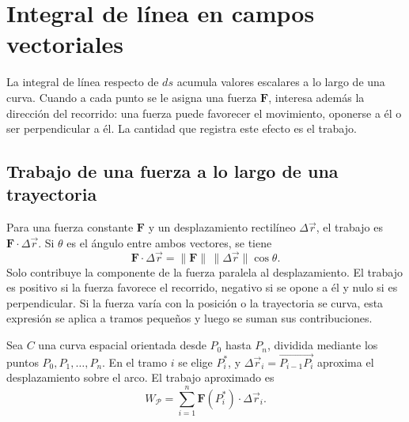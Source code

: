 \section{Integral de línea en campos vectoriales}

La integral de línea respecto de $ds$ acumula valores escalares a lo largo de una curva. Cuando a cada punto se le asigna una fuerza $\mathbf{F}$, interesa además la dirección del recorrido: una fuerza puede favorecer el movimiento, oponerse a él o ser perpendicular a él. La cantidad que registra este efecto es el trabajo.

\subsection{Trabajo de una fuerza a lo largo de una trayectoria}

Para una fuerza constante $\mathbf{F}$ y un desplazamiento rectilíneo $\Delta\vec r$, el trabajo es $\mathbf{F}\cdot\Delta\vec r$. Si $\theta$ es el ángulo entre ambos vectores, se tiene
\[
\mathbf{F}\cdot\Delta\vec r=\|\mathbf{F}\|\,\|\Delta\vec r\|\cos\theta.
\]
Solo contribuye la componente de la fuerza paralela al desplazamiento. El trabajo es positivo si la fuerza favorece el recorrido, negativo si se opone a él y nulo si es perpendicular. Si la fuerza varía con la posición o la trayectoria se curva, esta expresión se aplica a tramos pequeños y luego se suman sus contribuciones.

Sea $C$ una curva espacial orientada desde $P_0$ hasta $P_n$, dividida mediante los puntos $P_0,P_1,\ldots,P_n$. En el tramo $i$ se elige $P_i^*$, y $\Delta\vec r_i=\overrightarrow{P_{i-1}P_i}$ aproxima el desplazamiento sobre el arco. El trabajo aproximado es
\[
W_{\mathcal P}=\sum_{i=1}^n\mathbf{F}(P_i^*)\cdot\Delta\vec r_i.
\]

